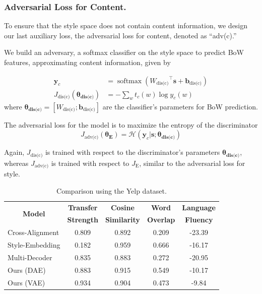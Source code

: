 \documentclass[letterpaper]{article} %
\newcommand{\tabh}[1]{\multicolumn{1}{c|}{\textbf{#1}}}
\newcommand{\tabc}[2]{\multicolumn{1}{|c||}{\multirow{#1}{*}{\textbf{#2}}}}
\newcommand{\loss}[1]{J_{\text{#1}}}
\newcommand{\nnweight}[1]{\bm{\theta_{\text{#1}}}}
\begin{document}
\subsubsection{Adversarial Loss for Content.} \label{ssec:adversarial-content-objective}

To ensure that the style space does not contain content information, we design our last auxiliary loss, the adversarial loss for content, denoted as ``adv(c).''

We build an adversary, a softmax classifier on the style space to predict BoW features, approximating content information, given by

\begin{align}
	\bm y_c                          & = \operatorname{softmax}({W_\text{dis(c)}}^\top \bm s + \bm b_\text{dis(c)}) \\
	\label{eqn:adv-bow-disc-loss}
	\loss{dis(c)}(\nnweight{dis(c)}) & =
	- \sum_w t_c(w)\log y_c(w)
\end{align}
where $\nnweight{dis(c)}=[W_\text{dis(c)}; \bm b_\text{dis(c)}]$ are the classifier's parameters for BoW prediction.

The adversarial loss for the model is to maximize the entropy of the discriminator
\begin{equation}
	\loss{adv(c)}(\nnweight{E}) = \mathcal{H}(\bm y_c | \bm s; \nnweight{dis(c)})
\end{equation}

Again, $\loss{dis(c)}$ is trained with respect to the discriminator's parameters $\nnweight{dis(c)}$, whereas $\loss{adv(c)}$ is trained with respect to $\loss{E}$, similar to the adversarial loss for style.

\begin{table}[ht]
	\centering
	\begin{tabular}{| l || c | c | c | c |}
		\hline
		\tabc{2}{Model}                            & \tabh{Transfer} & \tabh{Cosine}     & \tabh{Word}    & \tabh{Language} \\
		                                           & \tabh{Strength} & \tabh{Similarity} & \tabh{Overlap} & \tabh{Fluency}  \\
		\hline
		\hline
		Cross-Alignment \cite{shen2017style}       & 0.809           & 0.892             & 0.209          & -23.39          \\
		\hline
		Style-Embedding \cite{fu2017style}         & 0.182           & 0.959             & 0.666          & -16.17          \\
		\hline
		Multi-Decoder \cite{zhao2018adversarially} & 0.835           & 0.883             & 0.272          & -20.95          \\
		\hline
		Ours (DAE)                                 & 0.883           & 0.915             & 0.549          & -10.17          \\
		\hline
		Ours (VAE)                                 & 0.934           & 0.904             & 0.473          & -9.84           \\
		\hline
	\end{tabular}
	\caption{Comparison using the Yelp dataset.}
	\label{tab:yelp-comparison-previous}
\end{table}
\end{document}
